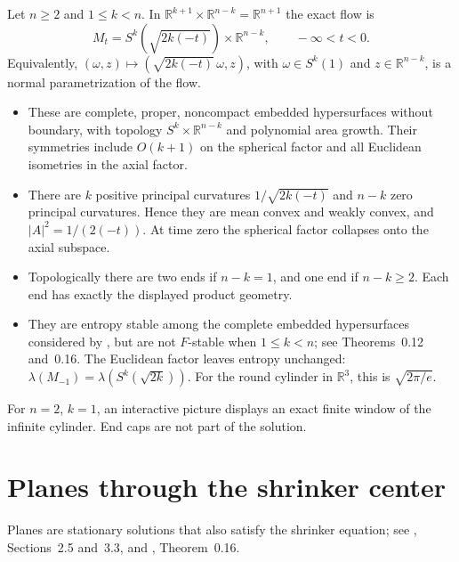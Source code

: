\begin{example}\label{ex:catalogue-round-cylinder}
Let $n\geq2$ and $1\leq k<n$. In
$\mathbb R^{k+1}\times\mathbb R^{n-k}=\mathbb R^{n+1}$ the exact flow is
\[
 M_t=S^k(\sqrt{2k(-t)})\times\mathbb R^{n-k},\qquad -\infty<t<0.
\]
Equivalently, $(\omega,z)\mapsto(\sqrt{2k(-t)}\,\omega,z)$,
with $\omega\in S^k(1)$ and $z\in\mathbb R^{n-k}$, is a normal
parametrization of the flow.
\begin{itemize}
\item These are complete, proper, noncompact embedded hypersurfaces without
boundary, with topology $S^k\times\mathbb R^{n-k}$ and polynomial area
growth. Their symmetries include $O(k+1)$ on the spherical factor and all
Euclidean isometries in the axial factor.
\item There are $k$ positive principal curvatures
$1/\sqrt{2k(-t)}$ and $n-k$ zero principal curvatures. Hence they are
mean convex and weakly convex, and $|A|^2=1/(2(-t))$.
At time zero the spherical factor collapses onto the axial subspace.
\item Topologically there are two ends if $n-k=1$, and one end if
$n-k\geq2$. Each end has exactly the displayed product geometry.
\item They are entropy stable among the complete embedded hypersurfaces
considered by \cite{CM12}, but are not $F$-stable when $1\leq k<n$;
see Theorems~0.12 and~0.16. The Euclidean factor leaves entropy unchanged:
$\lambda(M_{-1})=\lambda(S^k(\sqrt{2k}))$.
For the round cylinder in $\mathbb R^3$, this is $\sqrt{2\pi/e}$.
\end{itemize}
For $n=2$, $k=1$, an interactive picture displays an exact finite window of
the infinite cylinder. End caps are not part of the solution.
\end{example}

\chapter{Planes through the shrinker center}\label{sec:catalogue-plane-shrinker}
Planes are stationary solutions that also satisfy the shrinker equation;
see \cite{CatDLN2018}, Sections~2.5 and~3.3, and \cite{CM12},
Theorem~0.16.

